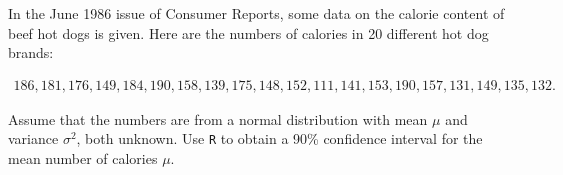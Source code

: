 
\begin{exercise}

In the June 1986 issue of Consumer Reports, some data on the calorie
content of beef hot dogs is given. Here are the numbers of calories in 20
different hot dog brands:

\begin{align*}
    186, 181, 176, 149, 184, 190, 158, 139, 175, 148,
    152, 111, 141, 153, 190, 157, 131, 149, 135, 132.
\end{align*}

Assume that the numbers are from a normal distribution with mean $\mu$
and variance $\sigma^2$, both unknown. Use \texttt{R} to obtain a 90\%
confidence interval for the mean number of calories $\mu$.

\end{exercise}


\begin{solution}

\phantom{}

\end{solution}

